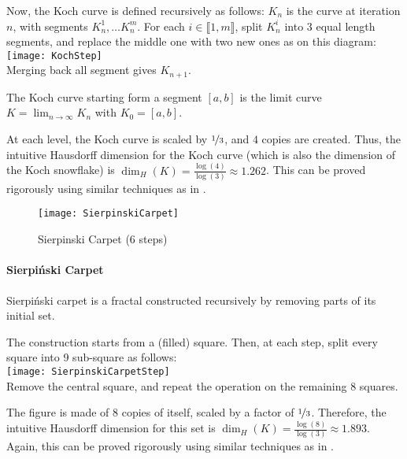 Now, the Koch curve is defined recursively as follows:
$K_n$ is the curve at iteration $n$, with segments $K_n^1, \dots K_n^m$.
For each $i \in \llbracket 1,m \rrbracket$, split $K_n^i$ into 3 equal length segments, and replace the middle one with two new ones as on this diagram:\vspace{0.2cm}\\
\texttt{[image: KochStep]}\vspace{0.2cm}\\
Merging back all segment gives $K_{n+1}$.

The Koch curve starting form a segment $[a,b]$ is the limit curve $K = \lim_{n \to \infty} K_n$ with $K_0 = [a,b]$.

At each level, the Koch curve is scaled by $\nicefrac{1}{3}$, and $4$ copies are created.
Thus, the intuitive Hausdorff dimension for the Koch curve (which is also the dimension of the Koch snowflake) is $\dim_H(K) = \frac{\log(4)}{\log(3)} \approx 1.262$.
This can be proved rigorously using similar techniques as in \cite[p. 34-35, ex. 2.7]{Falconer_1990}.

\begin{wrapfigure}{r}{5cm}
	\vspace{-0.5cm}
	\texttt{[image: SierpinskiCarpet]}
	\centering
	\captionsetup{justification=centering}
	\caption{Sierpinski Carpet (6 steps)}
	\label{fig:SierpinskiCarpet}
	\vspace{-3cm}
\end{wrapfigure}
\paragraph{Sierpiński Carpet}
Sierpiński carpet is a fractal constructed recursively by removing parts of its initial set.

The construction starts from a (filled) square.
Then, at each step, split every square into 9 sub-square as follows:\\
\texttt{[image: SierpinskiCarpetStep]}\\
Remove the central square, and repeat the operation on the remaining 8 squares.

The figure is made of $8$ copies of itself, scaled by a factor of $\nicefrac{1}{3}$.
Therefore, the intuitive Hausdorff dimension for this set is $\dim_H(K) = \frac{\log(8)}{\log(3)} \approx 1.893$.
Again, this can be proved rigorously using similar techniques as in \cite[p. 34-35, ex. 2.7]{Falconer_1990}.


